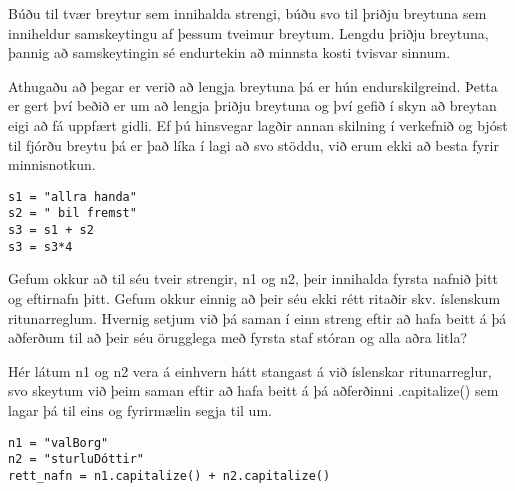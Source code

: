 \begin{exercise}\label{str6}
	Búðu til tvær breytur sem innihalda strengi, búðu svo til þriðju breytuna sem inniheldur samskeytingu af þessum tveimur breytum.
	Lengdu þriðju breytuna, þannig að samskeytingin sé endurtekin að minnsta kosti tvisvar sinnum.
\end{exercise}
\begin{Answer}[ref={str6}]
	Athugaðu að þegar er verið að lengja breytuna þá er hún endurskilgreind.
	Þetta er gert því beðið er um að lengja þriðju breytuna og því gefið í skyn að breytan eigi að fá uppfært gidli.
	Ef þú hinsvegar lagðir annan skilning í verkefnið og bjóst til fjórðu breytu þá er það líka í lagi að svo stöddu, við erum ekki að besta fyrir minnisnotkun.
\begin{lstlisting}
s1 = "allra handa"
s2 = " bil fremst"
s3 = s1 + s2
s3 = s3*4\end{lstlisting}
\end{Answer}

\begin{exercise}\label{str7}
Gefum okkur að til séu tveir strengir, n1 og n2, þeir innihalda fyrsta nafnið þitt og eftirnafn þitt.
Gefum okkur einnig að þeir séu ekki rétt ritaðir skv. íslenskum ritunarreglum.
Hvernig setjum við þá saman í einn streng eftir að hafa beitt á þá aðferðum til að þeir séu örugglega með fyrsta staf stóran og alla aðra litla?
\end{exercise}
\begin{Answer}[ref={str7}]
	Hér látum n1 og n2 vera á einhvern hátt stangast á við íslenskar ritunarreglur, svo skeytum við þeim saman eftir að hafa beitt á þá aðferðinni .capitalize() sem lagar þá til eins og fyrirmælin segja til um.
\begin{lstlisting}
n1 = "valBorg"
n2 = "sturluDóttir"
rett_nafn = n1.capitalize() + n2.capitalize()\end{lstlisting}
\end{Answer}

